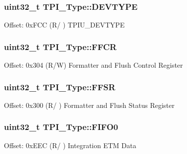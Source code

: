 \subsubsection[{\texorpdfstring{D\+E\+V\+T\+Y\+PE}{DEVTYPE}}]{ uint32\+\_\+t T\+P\+I\+\_\+\+Type\+::\+D\+E\+V\+T\+Y\+PE}\hypertarget{struct_t_p_i___type_a16d12c5b1e12f764fa3ec4a51c5f0f35}{}\label{struct_t_p_i___type_a16d12c5b1e12f764fa3ec4a51c5f0f35}
Offset\+: 0x\+F\+CC (R/ ) T\+P\+I\+U\+\_\+\+D\+E\+V\+T\+Y\+PE 
\subsubsection[{\texorpdfstring{F\+F\+CR}{FFCR}}]{ uint32\+\_\+t T\+P\+I\+\_\+\+Type\+::\+F\+F\+CR}\hypertarget{struct_t_p_i___type_a3eb42d69922e340037692424a69da880}{}\label{struct_t_p_i___type_a3eb42d69922e340037692424a69da880}
Offset\+: 0x304 (R/W) Formatter and Flush Control Register 
\subsubsection[{\texorpdfstring{F\+F\+SR}{FFSR}}]{ uint32\+\_\+t T\+P\+I\+\_\+\+Type\+::\+F\+F\+SR}\hypertarget{struct_t_p_i___type_ae67849b2c1016fe6ef9095827d16cddd}{}\label{struct_t_p_i___type_ae67849b2c1016fe6ef9095827d16cddd}
Offset\+: 0x300 (R/ ) Formatter and Flush Status Register 
\subsubsection[{\texorpdfstring{F\+I\+F\+O0}{FIFO0}}]{ uint32\+\_\+t T\+P\+I\+\_\+\+Type\+::\+F\+I\+F\+O0}\hypertarget{struct_t_p_i___type_ae91ff529e87d8e234343ed31bcdc4f10}{}\label{struct_t_p_i___type_ae91ff529e87d8e234343ed31bcdc4f10}
Offset\+: 0x\+E\+EC (R/ ) Integration E\+TM Data 

